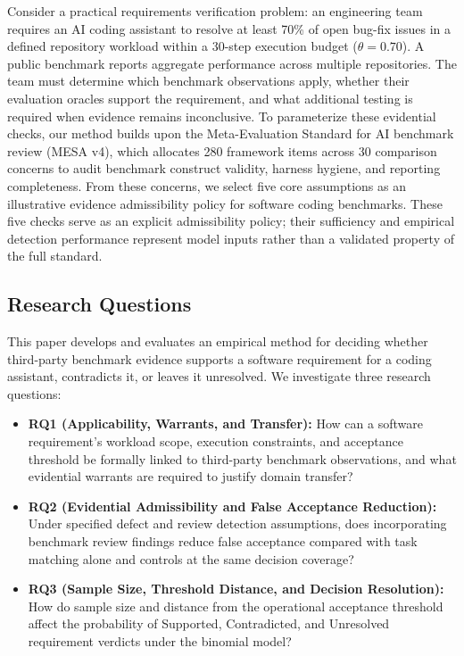\documentclass[runningheads]{llncs}
\begin{document}
Consider a practical requirements verification problem: an engineering team requires an AI coding assistant to resolve at least 70\% of open bug-fix issues in a defined repository workload within a 30-step execution budget ($\theta = 0.70$). A public benchmark reports aggregate performance across multiple repositories. The team must determine which benchmark observations apply, whether their evaluation oracles support the requirement, and what additional testing is required when evidence remains inconclusive. To parameterize these evidential checks, our method builds upon the Meta-Evaluation Standard for AI benchmark review (MESA v4), which allocates 280 framework items across 30 comparison concerns to audit benchmark construct validity, harness hygiene, and reporting completeness. From these concerns, we select five core assumptions as an illustrative evidence admissibility policy for software coding benchmarks. These five checks serve as an explicit admissibility policy; their sufficiency and empirical detection performance represent model inputs rather than a validated property of the full standard.

\subsection{Research Questions}
This paper develops and evaluates an empirical method for deciding whether third-party benchmark evidence supports a software requirement for a coding assistant, contradicts it, or leaves it unresolved. We investigate three research questions:
\begin{itemize}[leftmargin=*]
    \item \textbf{RQ1 (Applicability, Warrants, and Transfer):} How can a software requirement's workload scope, execution constraints, and acceptance threshold be formally linked to third-party benchmark observations, and what evidential warrants are required to justify domain transfer?
    \item \textbf{RQ2 (Evidential Admissibility and False Acceptance Reduction):} Under specified defect and review detection assumptions, does incorporating benchmark review findings reduce false acceptance compared with task matching alone and controls at the same decision coverage?
    \item \textbf{RQ3 (Sample Size, Threshold Distance, and Decision Resolution):} How do sample size and distance from the operational acceptance threshold affect the probability of Supported, Contradicted, and Unresolved requirement verdicts under the binomial model?
\end{itemize}
\end{document}
